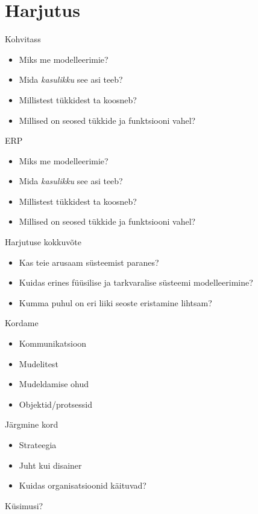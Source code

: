 \documentclass{beamer}
\begin{document}
\section{Harjutus}

\begin{frame}{Kohvitass}

\begin{itemize}
	\item Miks me modelleerimie?
	\item Mida \emph{kasulikku} see asi teeb?
	\item Millistest tükkidest ta koosneb?
	\item Millised on seosed tükkide ja funktsiooni vahel?
\end{itemize}

\end{frame}

\begin{frame}{ERP}

\begin{itemize}
	\item Miks me modelleerimie?
	\item Mida \emph{kasulikku} see asi teeb?
	\item Millistest tükkidest ta koosneb?
	\item Millised on seosed tükkide ja funktsiooni vahel?
\end{itemize}

\end{frame}


\begin{frame}{Harjutuse kokkuvõte}
	\begin{itemize}
		\item Kas teie arusaam süsteemist paranes?
		\item Kuidas erines füüsilise ja tarkvaralise süsteemi modelleerimine?
		\item Kumma puhul on eri liiki seoste eristamine lihtsam?
	\end{itemize}
\end{frame}

\begin{frame}{Kordame}
	\begin{itemize}
		\item Kommunikatsioon
		\item Mudelitest
		\item Mudeldamise ohud
		\item Objektid/protsessid
	\end{itemize}
\end{frame}

\begin{frame}{Järgmine kord}
\begin{itemize}
	\item Strateegia
	\item Juht kui disainer
	\item Kuidas organisatsioonid käituvad?
	\end{itemize}
\end{frame}

\begin{frame}[standout]
Küsimusi?
\end{frame}
\end{document}
